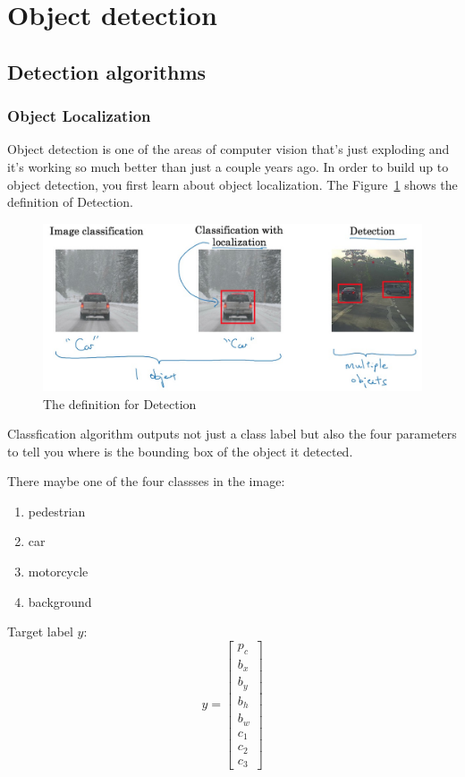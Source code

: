\documentclass[UTF8]{article}
\newcommand{\Vector}[1]{\boldsymbol{\mathit{#1}}}   %
\begin{document}
\section{Object detection}
\subsection{Detection algorithms}
\subsubsection{Object Localization}
Object detection is one of the areas of computer vision that's just exploding and it's working so
much better than just a couple years ago. In order to build up to object detection, you first learn
about object localization. The Figure~\ref{fig:detection-definition} shows the definition of
Detection.

\begin{figure}[htb]
    \centering
    \includegraphics[width=40em]{figures/detection-definition}
    \caption{The definition for Detection}
    \label{fig:detection-definition}
\end{figure}

Classfication algorithm outputs not just a class label but also the four parameters to tell you
where is the bounding box of the object it detected.

There maybe one of the four classses in the image:
\begin{enumerate}
    \item pedestrian
    \item car
    \item motorcycle
    \item background
\end{enumerate}

Target label $\Vector{y}$:
$$ \Vector{y} = \left[\begin{array}{c} p_c \\ b_x \\ b_y \\ b_h \\ b_w \\ c_1 \\ c_2 \\ c_3
\end{array}\right] $$
\end{document}
